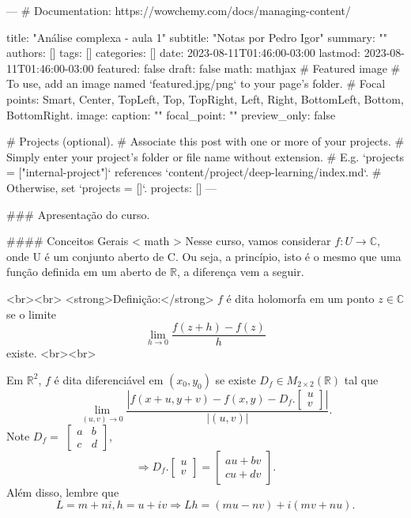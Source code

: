 ---
# Documentation: https://wowchemy.com/docs/managing-content/

title: "Análise complexa - aula 1"
subtitle: "Notas por Pedro Igor"
summary: ""
authors: []
tags: []
categories: []
date: 2023-08-11T01:46:00-03:00
lastmod: 2023-08-11T01:46:00-03:00
featured: false
draft: false
math: mathjax
# Featured image
# To use, add an image named `featured.jpg/png` to your page's folder.
# Focal points: Smart, Center, TopLeft, Top, TopRight, Left, Right, BottomLeft, Bottom, BottomRight.
image:
  caption: ""
  focal_point: ""
  preview_only: false

# Projects (optional).
#   Associate this post with one or more of your projects.
#   Simply enter your project's folder or file name without extension.
#   E.g. `projects = ["internal-project"]` references `content/project/deep-learning/index.md`.
#   Otherwise, set `projects = []`.
projects: []
---

### Apresentação do curso.

#### Conceitos Gerais
{{< math >}}
Nesse curso, vamos considerar $f: U \rightarrow \mathbb{C}$, onde U é um
conjunto aberto de C. Ou seja, a princípio, isto é o mesmo que uma função
definida em um aberto de $\mathbb{R}$, a diferença vem a seguir.

<br><br>
<strong>Definição:</strong>
$f$ é dita holomorfa em um ponto $z \in \mathbb{C}$ se o limite
$$\lim_{h\rightarrow 0}\dfrac{f(z+h)-f(z)}{h}$$ existe.
<br><br>

Em $\mathbb{R}^2$, $f$ é dita diferenciável em $(x_0,y_0)$ se existe $D_f \in M_{2\times 2}(\mathbb{R})$ tal que $$\lim_{(u,v)\rightarrow 0}\dfrac{|f(x+u,y+v)-f(x,y)-D_f.
\left[
\begin{array}{c}
u\\
v
\end{array}
\right]
|}{|(u,v)|}.$$
Note $D_f =$
$
\left[
\begin{array}{cc}
a&b \\
c&d
\end{array}
\right]
$,
$$\Rightarrow D_f.
\left[
\begin{array}{c}
u\\
v
\end{array}
\right]
=
\left[
\begin{array}{c}
au+bv\\
cu+dv
\end{array}
\right]
. $$
Além disso, lembre que $$L = m+ni, h = u+iv \Rightarrow Lh = (mu-nv)+i(mv+nu).$$

